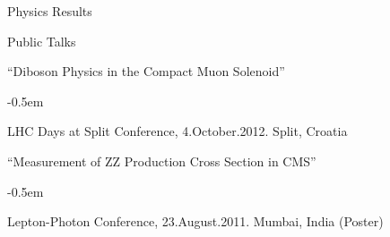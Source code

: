 \documentclass{resume} %
\begin{document}
\begin{rSection}{Physics Results}
\begin{rSubsection}{Public Talks}{}{}{}
\item ``Diboson Physics in the Compact Muon Solenoid''
    \begin{list}{}{\leftmargin=1.5em} 
      \itemsep -0.5em \vspace{-0.5em} %
      \item LHC Days at Split Conference, 4.October.2012. Split, Croatia
    \end{list} \item ``Measurement of ZZ Production Cross Section in CMS''
    \begin{list}{}{\leftmargin=1.5em} 
      \itemsep -0.5em \vspace{-0.5em} %
      \item Lepton-Photon Conference, 23.August.2011. Mumbai, India (Poster)
    \end{list}
\end{rSubsection}

\end{rSection}

\end{document}
